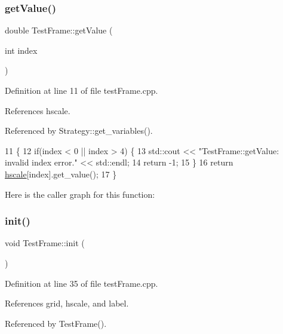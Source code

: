 \subsubsection{\texorpdfstring{get\+Value()}{getValue()}}
{\footnotesize\ttfamily double Test\+Frame\+::get\+Value (\begin{DoxyParamCaption}\item[{int}]{index }\end{DoxyParamCaption})}



Definition at line 11 of file test\+Frame.\+cpp.



References hscale.



Referenced by Strategy\+::get\+\_\+variables().


\begin{DoxyCode}
11                                     \{
12     \textcolor{keywordflow}{if}(index < 0 || index > 4) \{
13       std::cout << \textcolor{stringliteral}{"TestFrame::getValue: invalid index error."} << std::endl;
14         \textcolor{keywordflow}{return} -1;
15     \}
16     \textcolor{keywordflow}{return} \hyperlink{class_test_frame_ac85dadacc49bc00afc3df6c60635c1e3}{hscale}[index].get\_value();
17 \}
\end{DoxyCode}
Here is the caller graph for this function\+:
\mbox{\label{class_test_frame_a54de7710b7685cff78b034f0f631c31d}} 
\subsubsection{\texorpdfstring{init()}{init()}}
{\footnotesize\ttfamily void Test\+Frame\+::init (\begin{DoxyParamCaption}{ }\end{DoxyParamCaption})\hspace{0.3cm}{\ttfamily [private]}}



Definition at line 35 of file test\+Frame.\+cpp.



References grid, hscale, and label.



Referenced by Test\+Frame().


